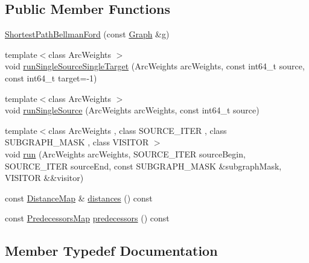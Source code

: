 \subsection*{Public Member Functions}
\begin{DoxyCompactItemize}
\item 
\hyperlink{classnifty_1_1graph_1_1ShortestPathBellmanFord_a7c47cefb1d6ff0335a32d5c7f991afaf}{Shortest\+Path\+Bellman\+Ford} (const \hyperlink{classnifty_1_1graph_1_1ShortestPathBellmanFord_affd61ff19b32441c605a63759511cfdc}{Graph} \&g)
\item 
{\footnotesize template$<$class Arc\+Weights $>$ }\\void \hyperlink{classnifty_1_1graph_1_1ShortestPathBellmanFord_a0b0ac675dcade4a09ac4c54a55ffb322}{run\+Single\+Source\+Single\+Target} (Arc\+Weights arc\+Weights, const int64\+\_\+t source, const int64\+\_\+t target=-\/1)
\item 
{\footnotesize template$<$class Arc\+Weights $>$ }\\void \hyperlink{classnifty_1_1graph_1_1ShortestPathBellmanFord_a2a400586a2b42f61751668b9e4539b62}{run\+Single\+Source} (Arc\+Weights arc\+Weights, const int64\+\_\+t source)
\item 
{\footnotesize template$<$class Arc\+Weights , class S\+O\+U\+R\+C\+E\+\_\+\+I\+T\+E\+R , class S\+U\+B\+G\+R\+A\+P\+H\+\_\+\+M\+A\+S\+K , class V\+I\+S\+I\+T\+O\+R $>$ }\\void \hyperlink{classnifty_1_1graph_1_1ShortestPathBellmanFord_ac70ef6c0b842b0ff7b7046d73e79a08c}{run} (Arc\+Weights arc\+Weights, S\+O\+U\+R\+C\+E\+\_\+\+I\+T\+E\+R source\+Begin, S\+O\+U\+R\+C\+E\+\_\+\+I\+T\+E\+R source\+End, const S\+U\+B\+G\+R\+A\+P\+H\+\_\+\+M\+A\+S\+K \&subgraph\+Mask, V\+I\+S\+I\+T\+O\+R \&\&visitor)
\item 
const \hyperlink{classnifty_1_1graph_1_1ShortestPathBellmanFord_afb719c11ba9422051fa5650115735e46}{Distance\+Map} \& \hyperlink{classnifty_1_1graph_1_1ShortestPathBellmanFord_a1f37d719386f1cc0611aa8a0cd82836c}{distances} () const 
\item 
const \hyperlink{classnifty_1_1graph_1_1ShortestPathBellmanFord_a871bb54c135ad8324dfff2d4a694372d}{Predecessors\+Map} \hyperlink{classnifty_1_1graph_1_1ShortestPathBellmanFord_aa09feff89e12a09097c49c3552c298cf}{predecessors} () const 
\end{DoxyCompactItemize}


\subsection{Member Typedef Documentation}
\hypertarget{classnifty_1_1graph_1_1ShortestPathBellmanFord_afb719c11ba9422051fa5650115735e46}{}
